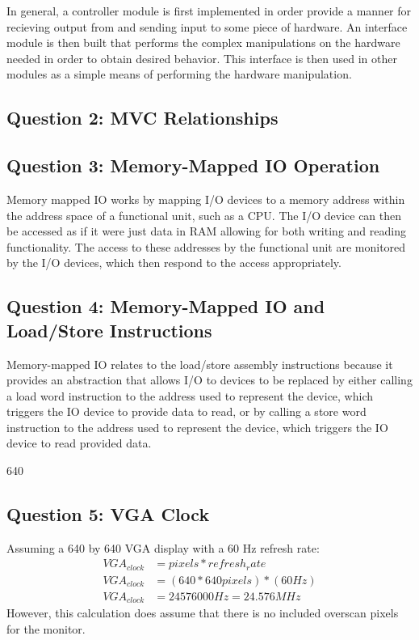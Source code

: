 \documentclass[letterpaper]{article} %
\begin{document}
        In general, a controller module is first implemented in order provide a manner for recieving output from and sending input to some piece of hardware. An interface module is then built that performs the complex manipulations on the hardware needed in order to obtain desired behavior. This interface is then used in other modules as a simple means of performing the hardware manipulation.
    
    \subsection{Question 2: MVC Relationships} 

    \subsection{Question 3: Memory-Mapped IO Operation}
        Memory mapped IO works by mapping I/O devices to a memory address within the address space of a functional unit, such as a CPU. The I/O device can then be accessed as if it were just data in RAM allowing for both writing and reading functionality. The access to these addresses by the functional unit are monitored by the I/O devices, which then respond to the access appropriately.
    
    \subsection{Question 4: Memory-Mapped IO and Load/Store Instructions}
        Memory-mapped IO relates to the load/store assembly instructions because it provides an abstraction that allows I/O to devices to be replaced by either calling a load word instruction to the address used to represent the device, which triggers the IO device to provide data to read, or by calling a store word instruction to the address used to represent the device, which triggers the IO device to read provided data. 
        
        640
    \subsection{Question 5: VGA Clock}
        Assuming a 640 by 640 VGA display with a 60 Hz refresh rate:
        \begin{align*}
            VGA_{clock} &= pixels * refresh_rate \\
            VGA_{clock} &= (640 * 640 pixels) * (60 Hz) \\
            VGA_{clock} &= 24576000 Hz = 24.576 MHz
        \end{align*}
        However, this calculation does assume that there is no included overscan pixels for the monitor. 
\end{document}
